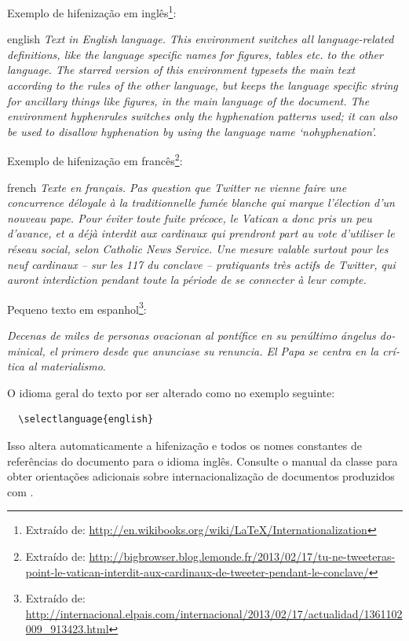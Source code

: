 \documentclass[article,12pt,oneside,a4paper,chapter=TITLE,english,brazil]{abntex2}
\begin{document}
\begin{anexosenv}
Exemplo de hifenização em inglês\footnote{Extraído de: \url{http://en.wikibooks.org/wiki/LaTeX/Internationalization}}:

\begin{otherlanguage*}{english}
\textit{Text in English language. This environment switches all language-related definitions, like the language specific names for figures, tables etc. to the other language. The starred version of this environment typesets the main text according to the rules of the other language, but keeps the language specific string for ancillary things like figures, in the main language of the document. The environment hyphenrules switches only the hyphenation patterns used; it can also be used to disallow hyphenation by using the language name `nohyphenation'.}
\end{otherlanguage*}

Exemplo de hifenização em francês\footnote{Extraído de: \url{http://bigbrowser.blog.lemonde.fr/2013/02/17/tu-ne-tweeteras-point-le-vatican-interdit-aux-cardinaux-de-tweeter-pendant-le-conclave/}}:

\begin{otherlanguage*}{french}
\textit{Texte en français. Pas question que Twitter ne vienne faire une concurrence déloyale à la traditionnelle fumée blanche qui marque l'élection d'un nouveau pape. Pour éviter toute fuite précoce, le Vatican a donc pris un peu d'avance, et a déjà interdit aux cardinaux qui prendront part au vote d'utiliser le réseau social, selon Catholic News Service. Une mesure valable surtout pour les neuf cardinaux – sur les 117 du conclave – pratiquants très actifs de Twitter, qui auront interdiction pendant toute la période de se connecter à leur compte.}
\end{otherlanguage*}

Pequeno texto em espanhol\footnote{Extraído de: \url{http://internacional.elpais.com/internacional/2013/02/17/actualidad/1361102009_913423.html}}:

\foreignlanguage{spanish}{\textit{Decenas de miles de personas ovacionan al pontífice en su penúltimo ángelus dominical, el primero desde que anunciase su renuncia. El Papa se centra en la crítica al materialismo}}.

O idioma geral do texto por ser alterado como no exemplo seguinte:
\begin{verbatim}
  \selectlanguage{english}
\end{verbatim}

Isso altera automaticamente a hifenização e todos os nomes constantes de referências do documento para o idioma inglês. Consulte o manual da classe \cite{abntex2classe} para obter orientações adicionais sobre internacionalização de documentos produzidos com \abnTeX.


\end{anexosenv}
\end{document}
